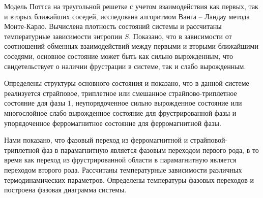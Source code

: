 Модель Поттса на треугольной решетке с учетом взаимодействия как первых, так и вторых ближайших соседей, исследована алгоритмом Ванга -- Ландау метода Монте-Карло. Вычислена плотность состояний системы и рассчитаны температурные зависимости энтропии $S$. Показано, что в зависимости от соотношений обменных взаимодействий между первыми и вторыми ближайшими соседями, основное состояние может быть как сильно вырожденным, что свидетельствует о наличии фрустрации в системе, так и слабо вырожденным.

Определены структуры основного состояния и показано, что в данной системе реализуется страйповое, триплетное или смешанное страйпово-триплетное состояние для фазы $1$, неупорядоченное сильно вырожденное состояние или многослойное слабо вырожденное состояние для фрустрированной фазы и упорядоченное ферромагнитное состояние для ферромагнитной фазы.

Нами показано, что фазовый переход из ферромагнитной и страйповой-триплетной фаз в парамагнитную является фазовым переходом первого рода, в то время как переход из фрустрированной области в парамагнитную является переходом второго рода. Рассчитаны температурные зависимости различных термодинамических параметров. Определены температуры фазовых переходов и построена фазовая диаграмма системы.


































%
%



